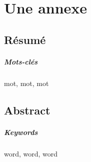 \documentclass[a4paper,11pt]{book}
\begin{document}
\appendix
\chapter{Une annexe}
\kant

\backmatter

\tableofcontents
\listoffigures
\listoftables

\dernierepage
\section*{Résumé}
\kant[1]
\paragraph{Mots-clés} mot, mot, mot

\section*{Abstract}
\kant[1]
\paragraph{Keywords} word, word, word
\end{document}
